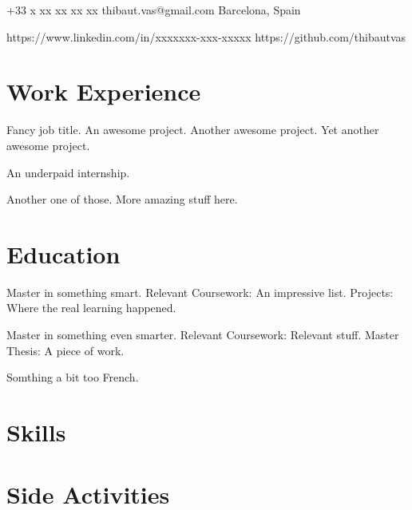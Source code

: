 \documentclass{templates/cv_en}
\begin{document}

\contact
{+33 x xx xx xx xx}  %
{thibaut.vas@gmail.com}	 %
{Barcelona, Spain}  %

\socials
{https://www.linkedin.com/in/xxxxxxx-xxx-xxxxx}  %
{https://github.com/thibautvas}  %


\section{Work Experience}

\fouritems
{Fancy job title.}
{An awesome project.}
{Another awesome project.}
{Yet another awesome project.}

\oneitem
{An underpaid internship.}

\twoitems
{Another one of those.}
{More amazing stuff here.}


\section{Education}

\threeitems
{Master in something smart.}
{Relevant Coursework: An impressive list.}
{Projects: Where the real learning happened.}

\threeitems
{Master in something even smarter.}
{Relevant Coursework: Relevant stuff.}
{Master Thesis: A piece of work.}


\oneitem
{Somthing a bit too French.}


\section{Skills}



\section{Side Activities}

\end{document}
